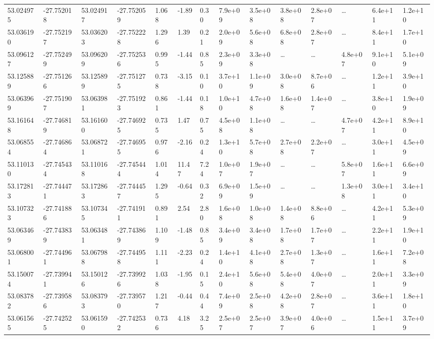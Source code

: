 \documentclass[referee]{aa}
\begin{document}
{\begin{landscape}
\begin{longtable}{llllllllllllll}
53.024975 & -27.752018 & 53.024917 & -27.752059 & 1.068 & -1.89 & 0.30 & 7.9e+09 & 3.5e+08 & 3.8e+08 & 2.8e+07 & \ldots & 6.4e+11 & 1.2e+10  \\
53.036190 & -27.752197 & 53.036203 & -27.752228 & 1.296 & 1.39 & 0.21 & 2.0e+09 & 5.6e+08 & 6.8e+08 & 2.8e+07 & \ldots & 8.4e+11 & 1.7e+10  \\
53.096127 & -27.752499 & 53.096209 & -27.752536 & 0.995 & -1.44 & 0.85 & 2.3e+09 & 3.3e+08 & \ldots & \ldots & 4.8e+07 & 9.1e+10 & 5.1e+09  \\
53.125889 & -27.751266 & 53.125899 & -27.751275 & 0.738 & -3.15 & 0.10 & 3.7e+10 & 1.1e+09 & 3.0e+08 & 8.7e+06 & \ldots & 1.2e+11 & 3.9e+10  \\
53.063969 & -27.751907 & 53.063981 & -27.751923 & 0.861 & -1.44 & 0.18 & 1.0e+10 & 4.7e+08 & 1.6e+08 & 1.4e+07 & \ldots & 3.8e+10 & 1.9e+09  \\
53.161648 & -27.746819 & 53.161600 & -27.746925 & 0.735 & 1.47 & 0.75 & 4.5e+08 & 1.1e+08 & \ldots & \ldots & 4.7e+07 & 4.2e+11 & 8.9e+10  \\
53.068554 & -27.746864 & 53.068721 & -27.746955 & 0.976 & -2.16 & 0.24 & 1.3e+10 & 5.7e+08 & 2.7e+08 & 2.2e+07 & \ldots & 3.0e+11 & 4.5e+09  \\
53.110130 & -27.745434 & 53.110168 & -27.745444 & 1.014 & 11.47 & 7.24 & 1.0e+07 & 1.9e+07 & \ldots & \ldots & 5.8e+07 & 1.6e+11 & 6.6e+09  \\
53.172813 & -27.744471 & 53.172863 & -27.744457 & 1.295 & -0.64 & 0.32 & 6.9e+09 & 1.5e+09 & \ldots & \ldots & 1.3e+08 & 3.0e+11 & 3.4e+10  \\
53.107323 & -27.741886 & 53.107345 & -27.741911 & 0.891 & 2.54 & 2.80 & 1.6e+08 & 1.0e+08 & 1.4e+08 & 8.8e+06 & \ldots & 4.2e+11 & 5.3e+09  \\
53.063469 & -27.743839 & 53.063481 & -27.743869 & 1.109 & -1.48 & 0.85 & 3.4e+09 & 3.4e+08 & 1.7e+08 & 1.7e+07 & \ldots & 2.2e+11 & 1.9e+10  \\
53.068001 & -27.744961 & 53.067988 & -27.744958 & 1.111 & -2.23 & 0.24 & 1.4e+10 & 4.1e+08 & 2.7e+08 & 1.3e+07 & \ldots & 1.6e+11 & 7.2e+08  \\
53.150074 & -27.739941 & 53.150126 & -27.739926 & 1.038 & -1.95 & 0.15 & 2.4e+10 & 5.6e+08 & 5.4e+08 & 4.0e+07 & \ldots & 2.0e+11 & 3.3e+09  \\
53.083782 & -27.739586 & 53.083793 & -27.739570 & 1.217 & -0.44 & 0.44 & 7.4e+09 & 2.5e+08 & 4.2e+08 & 2.8e+07 & \ldots & 3.6e+11 & 1.8e+10  \\
53.061565 & -27.742525 & 53.061590 & -27.742532 & 0.736 & 4.18 & 3.25 & 2.5e+07 & 2.5e+07 & 3.9e+07 & 4.0e+06 & \ldots & 1.5e+11 & 3.7e+09  \\

\end{longtable}
\end{landscape}}
\end{document}
